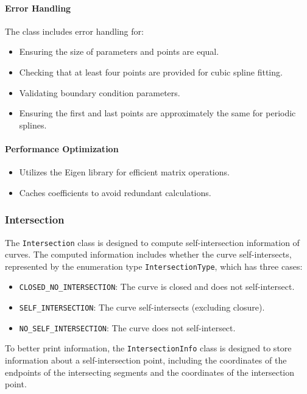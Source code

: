 \documentclass[a4paper]{article}
\begin{document}
\begin{sloppypar}
\paragraph*{Error Handling}
The class includes error handling for:
\begin{itemize}
  \item Ensuring the size of parameters and points are equal.
  \item Checking that at least four points are provided for cubic spline fitting.
  \item Validating boundary condition parameters.
  \item Ensuring the first and last points are approximately the same for periodic splines.
\end{itemize}

\paragraph*{Performance Optimization}
\begin{itemize}
  \item Utilizes the Eigen library for efficient matrix operations.
  \item Caches coefficients to avoid redundant calculations.
\end{itemize}

\subsubsection{Intersection}
The \verb|Intersection| class is designed to compute self-intersection information of curves. The computed information includes whether the curve self-intersects, represented by the enumeration type \verb|IntersectionType|, which has three cases:
\begin{itemize}
  \item \verb|CLOSED_NO_INTERSECTION|: The curve is closed and does not self-intersect.
  \item \verb|SELF_INTERSECTION|: The curve self-intersects (excluding closure).
  \item \verb|NO_SELF_INTERSECTION|: The curve does not self-intersect.
\end{itemize}

To better print information, the \verb|IntersectionInfo| class is designed to store information about a self-intersection point, including the coordinates of the endpoints of the intersecting segments and the coordinates of the intersection point.


\end{sloppypar}
\end{document}
